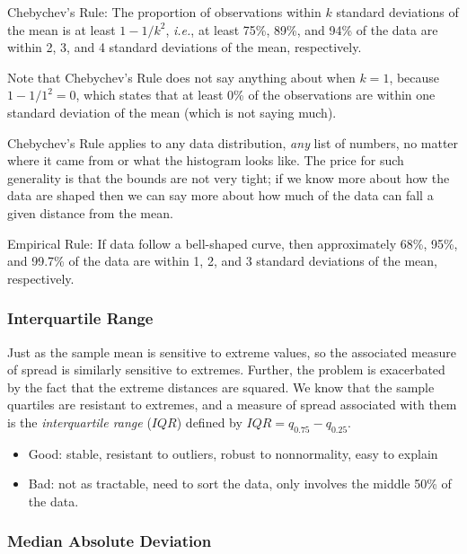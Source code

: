 \documentclass[10pt,english]{scrbook}
\begin{document}
\begin{fact}
Chebychev's Rule: The proportion of observations within \(k\) standard deviations of the mean is at least \(1-1/k^{2}\), \emph{i.e.}, at least 75\%, 89\%, and 94\% of the data are within 2, 3, and 4 standard deviations of the mean, respectively.
\end{fact}

Note that Chebychev's Rule does not say anything about when \(k=1\), because \(1-1/1^{2}=0\), which states that at least 0\% of the observations are within one standard deviation of the mean (which is not saying much).

Chebychev's Rule applies to any data distribution, \emph{any} list of numbers, no matter where it came from or what the histogram looks like. The price for such generality is that the bounds are not very tight; if we know more about how the data are shaped then we can say more about how much of the data can fall a given distance from the mean.

\begin{fact}
Empirical Rule: If data follow a bell-shaped curve, then approximately 68\%, 95\%, and 99.7\% of the data are within 1, 2, and 3 standard deviations of the mean, respectively. 
\end{fact}
\subsubsection[Interquartile Range]{Interquartile Range}
\label{sec-1-3-4-2}

Just as the sample mean is sensitive to extreme values, so the associated measure of spread is similarly sensitive to extremes. Further, the problem is exacerbated by the fact that the extreme distances are squared. We know that the sample quartiles are resistant to extremes, and a measure of spread associated with them is the \emph{interquartile range} (\(IQR\)) defined by \(IQR=q_{0.75}-q_{0.25}\).

\begin{itemize}
\item Good: stable, resistant to outliers, robust to nonnormality, easy to explain
\item Bad: not as tractable, need to sort the data, only involves the middle 50\% of the data.
\end{itemize}
\subsubsection[Median Absolute Deviation]{Median Absolute Deviation}
\label{sec-1-3-4-3}
\end{document}

